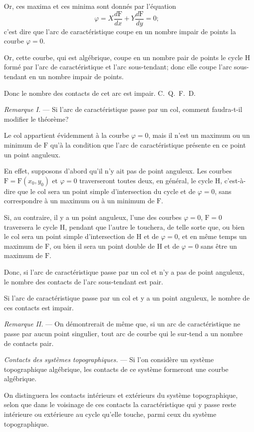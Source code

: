 \documentclass[11pt]{article}
\begin{document}
Or, ces maxima et ces minima sont donnés par l’équation
\[
\varphi=X\frac{d\mathrm F}{dx}+Y\frac{d\mathrm F}{dy}=0;
\]
c’est dire que l’arc de caractéristique coupe en un nombre impair de points la courbe $\varphi=0$.

Or, cette courbe, qui est algébrique, coupe en un nombre pair de points le cycle H formé par l’arc de caractéristique et l’arc sous-tendant; donc elle coupe l’arc sous-tendant en un nombre impair de points.

Donc le nombre des contacts de cet arc est impair. \hfill\mbox{C. Q. F. D.}

\emph{Remarque I.} --- Si l’arc de caractéristique passe par un col, comment faudra-t-il modifier le théorème?

Le col appartient évidemment à la courbe $\varphi=0$, mais il n’est un maximum ou un minimum de $\mathrm F$ qu’à la condition que l’arc de caractéristique présente en ce point un point anguleux.

En effet, supposons d’abord qu’il n’y ait pas de point anguleux. Les courbes $\mathrm F=\mathrm F(x_0,y_0)$ et $\varphi=0$ traverseront toutes deux, en général, le cycle H, c’est-à-dire que le col sera un point simple d’intersection du cycle et de $\varphi=0$, sans correspondre à un maximum ou à un minimum de $\mathrm F$.

Si, au contraire, il y a un point anguleux, l’une des courbes $\varphi=0$, $\mathrm F=0$ traversera le cycle H, pendant que l’autre le touchera, de telle sorte que, ou bien le col sera un point simple d’intersection de H et de $\varphi=0$, et en même temps un maximum de $\mathrm F$, ou bien il sera un point double de H et de $\varphi=0$ sans être un maximum de $\mathrm F$.

Donc, si l’arc de caractéristique passe par un col et n’y a pas de point anguleux, le nombre des contacts de l’arc sous-tendant est pair.

Si l’arc de caractéristique passe par un col et y a un point anguleux, le nombre de ces contacts est impair.

\emph{Remarque II.} --- On démontrerait de même que, si un arc de caractéristique ne passe par aucun point singulier, tout arc de courbe qui le sur-tend a un nombre de contacts pair.

\emph{Contacts des systèmes topographiques.} --- Si l’on considère un système topographique algébrique, les contacts de ce système formeront une courbe algébrique.

On distinguera les contacts intérieurs et extérieurs du système topographique, selon que dans le voisinage de ces contacts la caractéristique qui y passe reste intérieure ou extérieure au cycle qu’elle touche, parmi ceux du système topographique.
\end{document}

